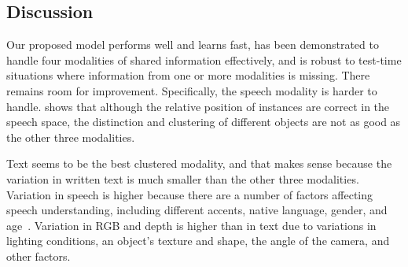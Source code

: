 \documentclass[10pt]{article} %
\begin{document}




\subsection{Discussion}
Our proposed model performs well and learns fast, has been demonstrated to handle four modalities of shared information effectively, and is robust to test-time situations where information from one or more modalities is missing. There remains room for improvement. Specifically, the speech modality is harder to handle.  shows that although the relative position of instances are correct in the speech space, the distinction and clustering of different objects are not as good as the other three modalities.

Text seems to be the best clustered modality, and that makes sense because the variation in written text is much smaller than the other three modalities. Variation in speech is higher because there are a number of factors affecting speech understanding, including different accents, native language, gender, and age~\citep{KebeAAAI2022}. Variation in RGB and depth is higher than in text due to variations in lighting conditions, an object's texture and shape, the angle of the camera, and other factors.
\end{document}
